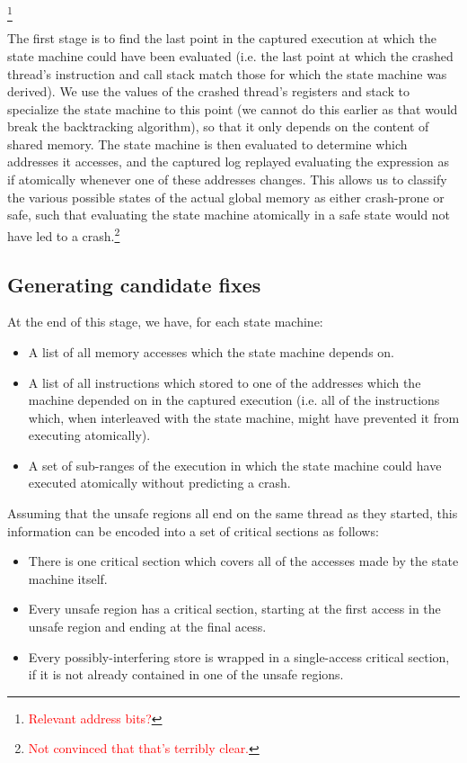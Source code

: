 \documentclass[10pt,twocolumn,preprint,natbib,authoryear]{sigplanconf}
\newcommand{\editorial}[1]{\textcolor{red}{\footnote{\textcolor{red}{#1}}}}
\begin{document}
\editorial{Relevant address bits?}

The first stage is to find the last point in the captured execution at
which the state machine could have been evaluated (i.e. the last point
at which the crashed thread's instruction and call stack match those
for which the state machine was derived).  We use the values of the
crashed thread's registers and stack to specialize the state machine
to this point (we cannot do this earlier as that would break the
backtracking algorithm), so that it only depends on the content of
shared memory.  The state machine is then evaluated to determine which
addresses it accesses, and the captured log replayed evaluating the
expression as if atomically whenever one of these addresses changes.
This allows us to classify the various possible states of the actual
global memory as either crash-prone or safe, such that evaluating the
state machine atomically in a safe state would not have led to a
crash.\editorial{Not convinced that that's terribly clear.}

\subsection{Generating candidate fixes}
\label{sect:gen_fix}

At the end of this stage, we have, for each state machine:

\begin{itemize}
\item A list of all memory accesses which the state machine depends
  on.
\item A list of all instructions which stored to one of the addresses
  which the machine depended on in the captured execution (i.e. all of
  the instructions which, when interleaved with the state machine,
  might have prevented it from executing atomically).
\item A set of sub-ranges of the execution in which the state machine
  could have executed atomically without predicting a crash.
\end{itemize}

Assuming that the unsafe regions all end on the same thread as they
started, this information can be encoded into a set of critical
sections as follows:

\begin{itemize}
\item There is one critical section which covers all of the accesses
  made by the state machine itself.
\item Every unsafe region has a critical section, starting at the
  first access in the unsafe region and ending at the final acess.
\item Every possibly-interfering store is wrapped in a single-access
  critical section, if it is not already contained in one of the
  unsafe regions.
\end{itemize}
\end{document}
